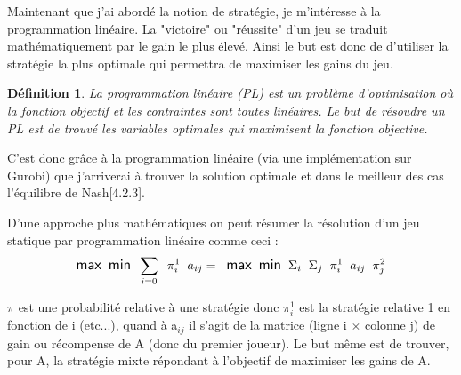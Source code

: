 \documentclass[a4paper, 12pt, twoside]{article}
\newtheorem{definition}{Définition}
\begin{document}
{Maintenant que j'ai abordé la notion de stratégie, je m'intéresse à la programmation linéaire. La "victoire" ou "réussite" d'un jeu se traduit mathématiquement par le \textsf{gain} le plus élevé. Ainsi le but est donc de d'utiliser la stratégie la plus optimale qui permettra de maximiser les \textsf{gains} du jeu.

\begin{definition}
La programmation linéaire (PL) est un problème d'optimisation où la fonction objectif et les contraintes sont toutes linéaires. Le but de résoudre un PL est de trouvé les variables optimales qui maximisent la fonction objective.
\end{definition}

C'est donc grâce à la \textsf{programmation linéaire} (via une implémentation sur \textsf{Gurobi}) que  j'arriverai à trouver la solution optimale et dans le meilleur des cas \textsf{l'équilibre de Nash}[4.2.3]. \newline

D'une approche plus mathématiques on peut résumer la résolution d'un \textsf{jeu statique} par \textsf{programmation linéaire} comme ceci : \newline
\begin{align*}
\large \textsf{max} \hspace{0,2 cm} \textsf{min} \hspace{0,2 cm} \sum_{i=0}\hspace{0,2 cm} \pi_{i}^{1}\hspace{0,2 cm} a _{ij}  =\hspace{0,2 cm} \textsf{max} \hspace{0,2 cm} \textsf{min} \hspace{0,2 cm}\Sigma _{i}\hspace{0,2 cm} \Sigma _{j}\hspace{0,2 cm} \pi_{i}^{1}\hspace{0,2 cm} a _{ij} \hspace{0,2 cm} \pi_{j}^{2} 
\end{align*}

$ \pi $ est une probabilité relative à une stratégie donc $\pi_{i}^{1}$ est la stratégie relative 1 en fonction de i (etc...), quand à a$ _{ij} $ il s'agit de la matrice (ligne \textsf{i} $\times$ colonne \textsf{j}) de gain ou récompense de A (donc du premier joueur).  Le but même est de trouver, pour A, la stratégie mixte répondant à l'objectif de maximiser les gains de A. \newline

}
\end{document}

